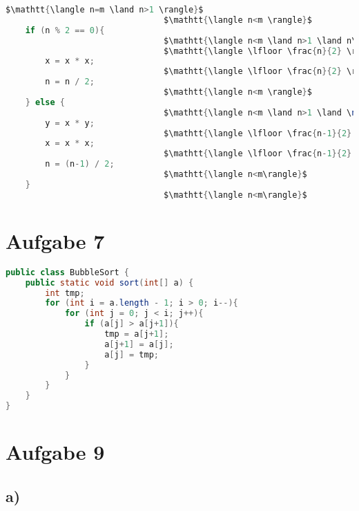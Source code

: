 \documentclass[a4paper,11pt]{scrartcl}
\begin{document}
	\begin{lstlisting}[mathescape=true, language=java]
								$\mathtt{\langle n=m \land n>1 \rangle}$
								$\mathtt{\langle n<m \rangle}$
	if (n % 2 == 0){
								$\mathtt{\langle n<m \land n>1 \land n\ mod\ 2 =0 \rangle}$
								$\mathtt{\langle \lfloor \frac{n}{2} \rfloor <m\rangle}$
		x = x * x;
								$\mathtt{\langle \lfloor \frac{n}{2} \rfloor <m\rangle}$
		n = n / 2;
								$\mathtt{\langle n<m \rangle}$
	} else {
								$\mathtt{\langle n<m \land n>1 \land \neg (n\ mod\ 2 =0) \rangle}$
		y = x * y;
								$\mathtt{\langle \lfloor \frac{n-1}{2} \rfloor <m\rangle}$			
		x = x * x;
								$\mathtt{\langle \lfloor \frac{n-1}{2} \rfloor <m\rangle}$			
		n = (n-1) / 2;
								$\mathtt{\langle n<m\rangle}$	
	}
								$\mathtt{\langle n<m\rangle}$
	\end{lstlisting}






\section*{Aufgabe 7}


	\begin{lstlisting}[mathescape=true, language=java]		
public class BubbleSort {
	public static void sort(int[] a) {
		int tmp; 
		for (int i = a.length - 1; i > 0; i--){
			for (int j = 0; j < i; j++){ 
				if (a[j] > a[j+1]){
					tmp = a[j+1];
					a[j+1] = a[j];
					a[j] = tmp;
				}
			}
		}
	}
}	
	\end{lstlisting}






\section*{Aufgabe 9}
\subsection*{a)}
\end{document}
